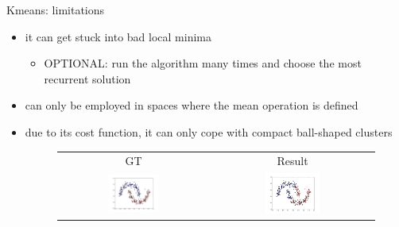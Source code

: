 \begin{frame}{Kmeans: limitations}
\begin{itemize}
\item it can get stuck into bad local minima
\begin{itemize}
\item OPTIONAL: run the algorithm many times and choose the most recurrent solution
\end{itemize}
\item can only be employed in spaces where the mean operation is defined
\item due to its cost function, it can only cope with compact ball-shaped clusters
\begin{figure}
\begin{tabular}{cc}
\small{GT} & \small{Result}\\
\includegraphics[width=0.35\textwidth]{img/kmeans/tm_gt.pdf}&
\includegraphics[width=0.35\textwidth]{img/kmeans/tm_fail.pdf}
\end{tabular}
\end{figure}
\end{itemize}
\end{frame}